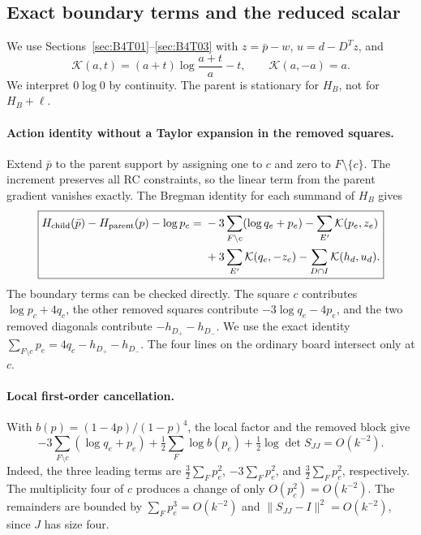 \subsection{Exact boundary terms and the reduced scalar}\label{sec:B4T04}
We use Sections~\ref{sec:B4T01}--\ref{sec:B4T03} with $z=\bar p-w$, $u=d-D^Tz$, and
\[
 \mathcal K(a,t)=(a+t)\log\frac{a+t}{a}-t,
 \qquad \mathcal K(a,-a)=a.
\]
We interpret $0\log0$ by continuity.
The parent is stationary for $H_B$, not for $H_B+\ell$.

\paragraph{Action identity without a Taylor expansion in the removed squares.}
Extend $\bar p$ to the parent support by assigning one to $c$ and zero to $F\setminus\{c\}$. The increment
preserves all RC constraints, so the linear term from the parent gradient vanishes exactly. The Bregman
identity for each summand of $H_B$ gives
\[
 \boxed{\begin{aligned}
 H_{\rm child}(\bar p)-H_{\rm parent}(p)-\log p_c
 ={}&-3\sum_{F\setminus c}(\log q_e+p_e)
 -\sum_{E'}\mathcal K(p_e,z_e)\\
 &+3\sum_{E'}\mathcal K(q_e,-z_e)
 -\sum_{D\cap I}\mathcal K(h_d,u_d).
 \end{aligned}}
\]
The boundary terms can be checked directly. The square $c$ contributes $\log p_c+4q_c$, the other removed
squares contribute $-3\log q_e-4p_e$, and the two removed diagonals contribute $-h_{D_+}-h_{D_-}$. We use
the exact identity $\sum_{F\setminus c}p_e=4q_c-h_{D_+}-h_{D_-}$.
The four lines on the ordinary board intersect only at $c$.

\paragraph{Local first-order cancellation.}
With $b(p)=(1-4p)/(1-p)^4$, the local factor and the removed block give
\[
 -3\sum_{F\setminus c}(\log q_e+p_e)
 +\tfrac12\sum_F\log b(p_e)+\tfrac12\log\det S_{JJ}=O(k^{-2}).
\]
Indeed, the three leading terms are $\tfrac32\sum_Fp_e^2$, $-3\sum_Fp_e^2$, and $\tfrac32\sum_Fp_e^2$,
respectively.
The multiplicity four of $c$ produces a change of only $O(p_c^2)=O(k^{-2})$. The remainders are bounded by
$\sum_Fp_e^3=O(k^{-2})$ and $\|S_{JJ}-I\|^2=O(k^{-2})$, since $J$ has size four.

